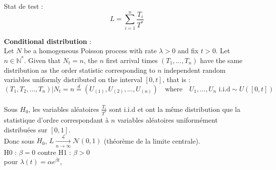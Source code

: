 \documentclass[12pt,a4paper]{article}
\begin{document}
Stat de test :
$$
L = \sum_{i=1}^n \frac{T_i}{T^*}
$$

\textbf{Conditional distribution} : \\
Let $N$ be a homogeneous Poisson process with rate $\lambda > 0$
and fix $t > 0$. Let $n \in \mathbb{N}^*$.
Given that $N_t = n$, the $n$ first arrival times $(T_1, \ldots, T_n)$ have the same distribution as the order statistic corresponding to $n$ independent random variables uniformly distributed on the interval $[0, t]$,
that is : \\
$$
(T_1, T_2, \ldots, T_n)|{N_t = n} \overset{d}{=} (U_{(1)}, U_{(2)}, \ldots, U_{(n)}) \quad \text{where} \quad U_1, \ldots, U_n \text{ i.i.d} \sim U([0, t])
$$ \\

Sous $H_0$, les variables aléatoires $\frac{T_i}{T^*}$ sont i.i.d et ont la même distribution que la statistique d'ordre correspondant à $n$ variables aléatoires uniformément distribuées sur $[0, 1]$. \\
Donc sous $H_0$, $L \xrightarrow[n \to \infty]{\mathcal{L}} \mathcal{N}(0, 1)$ (théorème de la limite centrale). \\

H0 : $\beta = 0$ contre H1 : $\beta > 0$ \\
pour $\lambda(t) = \alpha e^{\beta t}$, 
\end{document}
